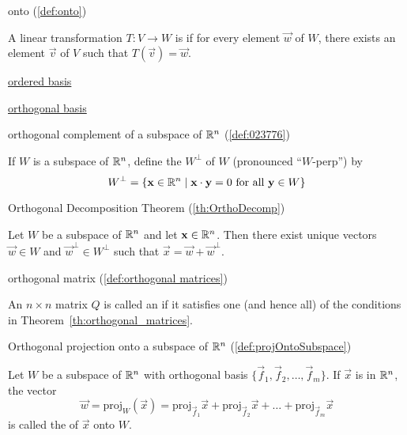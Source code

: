 \documentclass{ximera}
\begin{document}
onto (\ref{def:onto})
\begin{expandable}
    A linear transformation $T:V\rightarrow W$ is  if for every element $\vec{w}$ of $W$, there exists an element $\vec{v}$ of $V$ such that $T(\vec{v})=\vec{w}$.
\end{expandable}

\href{https://ximera.osu.edu/oerlinalg/LinearAlgebra/VSP-0060/main}{ordered basis}

\href{https://ximera.osu.edu/oerlinalg/LinearAlgebra/RTH-0010/main}{orthogonal basis}

orthogonal complement of a subspace of $\mathbb{R}^n$ (\ref{def:023776})
\begin{expandable}
    If $W$ is a subspace of $\mathbb{R}^n$, define the  $W^\perp$ of $W$ (pronounced ``$W$-perp'') by
\begin{equation*}
W^\perp = \{\mathbf{x} \in\mathbb{R}^n \mid \mathbf{x} \cdot \mathbf{y} = 0 \mbox{ for all } \mathbf{y} \in W\}
\end{equation*}
\end{expandable}

Orthogonal Decomposition Theorem (\ref{th:OrthoDecomp})
\begin{expandable}
    Let $W$ be a subspace of $\mathbb{R}^n$ and let $\mathbf{x} \in \mathbb{R}^n$.  Then there exist unique vectors $\vec{w} \in W$ and $\vec{w}^\perp \in W^\perp$ such that $\vec{x} = \vec{w} + \vec{w}^\perp$.
\end{expandable}

orthogonal matrix (\ref{def:orthogonal matrices})
\begin{expandable}
    An $n \times n$ matrix $Q$ is called an  if it satisfies one (and hence all) of the conditions in Theorem~\ref{th:orthogonal_matrices}.
\end{expandable}

Orthogonal projection onto a subspace of $\mathbb{R}^n$ (\ref{def:projOntoSubspace})
\begin{expandable}
    Let $W$ be a subspace of $\mathbb{R}^n$ with orthogonal basis $\{\vec{f}_{1}, \vec{f}_{2}, \dots, \vec{f}_{m}\}$. If $\vec{x}$ is in $\mathbb{R}^n$, the vector
\begin{equation}
\vec{w}=\mbox{proj}_W(\vec{x}) = \mbox{proj}_{\vec{f}_1}\vec{x} + \mbox{proj}_{\vec{f}_2}\vec{x} + \dots + \mbox{proj}_{\vec{f}_m}\vec{x}
\end{equation}
is called the  of $\vec{x}$ onto $W$. 
\end{expandable}
\end{document}

